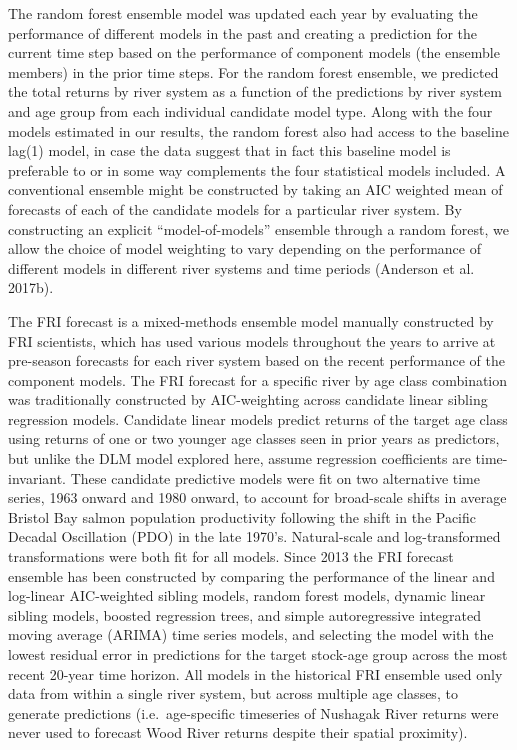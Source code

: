 \documentclass[
]{article}
\begin{document}
The random forest ensemble model was updated each year by evaluating the performance of different models in the past and creating a prediction for the current time step based on the performance of component models (the ensemble members) in the prior time steps. For the random forest ensemble, we predicted the total returns by river system as a function of the predictions by river system and age group from each individual candidate model type. Along with the four models estimated in our results, the random forest also had access to the baseline lag(1) model, in case the data suggest that in fact this baseline model is preferable to or in some way complements the four statistical models included. A conventional ensemble might be constructed by taking an AIC weighted mean of forecasts of each of the candidate models for a particular river system. By constructing an explicit ``model-of-models'' ensemble through a random forest, we allow the choice of model weighting to vary depending on the performance of different models in different river systems and time periods (Anderson et al. 2017b).

The FRI forecast is a mixed-methods ensemble model manually constructed by FRI scientists, which has used various models throughout the years to arrive at pre-season forecasts for each river system based on the recent performance of the component models. The FRI forecast for a specific river by age class combination was traditionally constructed by AIC-weighting across candidate linear sibling regression models. Candidate linear models predict returns of the target age class using returns of one or two younger age classes seen in prior years as predictors, but unlike the DLM model explored here, assume regression coefficients are time-invariant. These candidate predictive models were fit on two alternative time series, 1963 onward and 1980 onward, to account for broad-scale shifts in average Bristol Bay salmon population productivity following the shift in the Pacific Decadal Oscillation (PDO) in the late 1970's. Natural-scale and log-transformed transformations were both fit for all models. Since 2013 the FRI forecast ensemble has been constructed by comparing the performance of the linear and log-linear AIC-weighted sibling models, random forest models, dynamic linear sibling models, boosted regression trees, and simple autoregressive integrated moving average (ARIMA) time series models, and selecting the model with the lowest residual error in predictions for the target stock-age group across the most recent 20-year time horizon. All models in the historical FRI ensemble used only data from within a single river system, but across multiple age classes, to generate predictions (i.e.~age-specific timeseries of Nushagak River returns were never used to forecast Wood River returns despite their spatial proximity).
\end{document}
